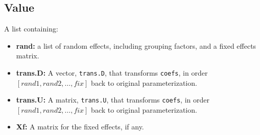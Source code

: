 \documentclass{article}
\begin{document}
\subsection{Value}
A list containing:
\begin{itemize}
    \item \textbf{rand:} a list of random effects, including grouping factors, and a fixed effects matrix.
    \item \textbf{trans.D:} A vector, \texttt{trans.D}, that transforms \texttt{coefs}, in order \([rand1, rand2, \ldots, fix]\) back to original parameterization.
    \item \textbf{trans.U:} A matrix, \texttt{trans.U}, that transforms \texttt{coefs}, in order \([rand1, rand2, \ldots, fix]\) back to original parameterization.
    \item \textbf{Xf:} A matrix for the fixed effects, if any.
\end{itemize}
\end{document}
